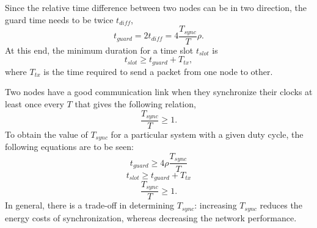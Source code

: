 \documentclass[journal]{IEEEtran}
\begin{document}
Since the relative time difference between two nodes can be in two direction, the guard time needs to be twice $t_{diff}$,
\begin{equation}
t_{guard}= 2t_{diff} = 4\dfrac{T_{sync}}{T}\rho.
\end{equation}
At this end, the minimum duration for a time slot $t_{slot}$ is
\begin{equation}
t_{slot} \geq t_{guard} + T_{tx},
\end{equation}
where $T_{tx}$ is the time required to send a packet from one node to other.
\par Two nodes have a good communication link when they synchronize
their clocks at least once every $T$ that gives the following
relation,
\begin{equation}
\dfrac{T_{sync}}{T}\geq 1.
\end{equation}
To obtain the value of $T_{sync}$ for a particular system with a given duty cycle, the following equations are to be seen:
\begin{equation}
t_{guard} \geq 4\rho \dfrac{T_{sync}}{T}
\end{equation}
\begin{equation}
t_{slot} \geq t_{guard} + T_{tx}
\end{equation}
\begin{equation}
\dfrac{T_{sync}}{T} \geq 1.
\end{equation}
In general, there is a trade-off in determining $T_{sync}$: increasing $T_{sync}$ reduces the energy costs of synchronization, whereas decreasing the network performance.
\end{document}
